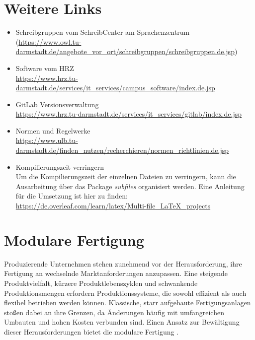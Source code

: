 \section{Weitere Links}
\begin{sloppypar}
\begin{itemize}
    \item Schreibgruppen vom SchreibCenter am Sprachenzentrum\\ (\url{https://www.owl.tu-darmstadt.de/angebote_vor_ort/schreibgruppen/schreibgruppen.de.jsp})
    \item Software vom HRZ\\
\url{https://www.hrz.tu-darmstadt.de/services/it_services/campus_software/index.de.jsp}
    \item GitLab Versionsverwaltung\\ \url{https://www.hrz.tu-darmstadt.de/services/it_services/gitlab/index.de.jsp}
    \item Normen und Regelwerke\\
\url{https://www.ulb.tu-darmstadt.de/finden_nutzen/recherchieren/normen_richtlinien.de.jsp}
    \item Kompilierungszeit verringern\\
Um die Kompilierungszeit der einzelnen Dateien zu verringern, kann die Ausarbeitung über das Package \textit{subfiles} organisiert werden. Eine Anleitung für die Umsetzung ist hier zu finden: \url{https://de.overleaf.com/learn/latex/Multi-file_LaTeX_projects}

\end{itemize}
\end{sloppypar}

\section{Modulare Fertigung}
\label{sec:ModulareFertigung}

Produzierende Unternehmen stehen zunehmend vor der Herausforderung, ihre Fertigung an wechselnde Marktanforderungen anzupassen. Eine steigende Produktvielfalt, kürzere Produktlebenszyklen und schwankende Produktionsmengen erfordern Produktionssysteme, die sowohl effizient als auch flexibel betrieben werden können. Klassische, starr aufgebaute Fertigungsanlagen stoßen dabei an ihre Grenzen, da Änderungen häufig mit umfangreichen Umbauten und hohen Kosten verbunden sind. Einen Ansatz zur Bewältigung dieser Herausforderungen bietet die modulare Fertigung \cite{Borgmann2026,Trautner2026}.

